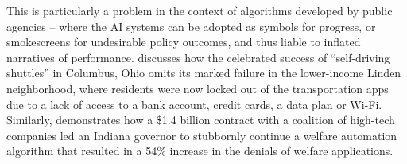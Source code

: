 \documentclass[acmconf,manuscript,screen,natbib=true]{acmart}
\begin{document}
This is particularly a problem in the context of algorithms developed by public agencies -- where the AI systems can be adopted
as symbols for progress, or smokescreens for undesirable policy outcomes, and thus liable to inflated narratives of performance. \citet{green2019smart} discusses how the celebrated success of ``self-driving shuttles'' in Columbus, Ohio omits its marked failure in the lower-income Linden neighborhood, where residents were now locked out of the transportation apps due to a lack of access to a bank account, credit cards, a data plan or Wi-Fi. Similarly, \citet{virginia_eubanks} demonstrates how a \$1.4 billion contract with a coalition of high-tech companies led an Indiana governor to stubbornly continue a welfare automation algorithm that resulted in a 54\% increase in the denials of welfare applications. %








\end{document}
